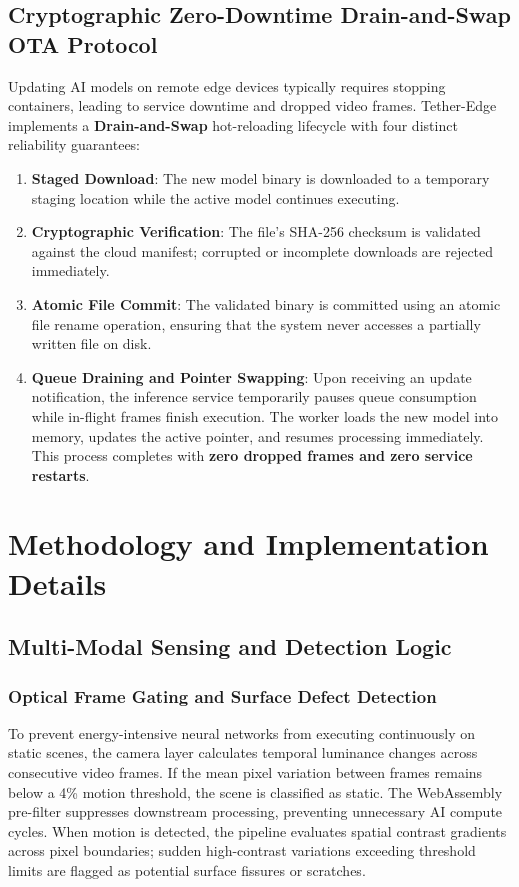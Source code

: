 \documentclass[conference]{IEEEtran}
\begin{document}
    \subsection{Cryptographic Zero-Downtime Drain-and-Swap OTA Protocol}
    Updating AI models on remote edge devices typically requires stopping containers, leading to service downtime and dropped video frames. Tether-Edge implements
    a \textbf{Drain-and-Swap} hot-reloading lifecycle with four distinct reliability guarantees:
    \begin{enumerate}
        \item \textbf{Staged Download}: The new model binary is downloaded to a temporary staging location while the active model continues executing.
        \item \textbf{Cryptographic Verification}: The file's SHA-256 checksum is validated against the cloud manifest; corrupted or incomplete downloads are
        rejected immediately.
        \item \textbf{Atomic File Commit}: The validated binary is committed using an atomic file rename operation, ensuring that the system never accesses a
        partially written file on disk.
        \item \textbf{Queue Draining and Pointer Swapping}: Upon receiving an update notification, the inference service temporarily pauses queue consumption while
        in-flight frames finish execution. The worker loads the new model into memory, updates the active pointer, and resumes processing immediately. This process
        completes with \textbf{zero dropped frames and zero service restarts}.
    \end{enumerate}

    \section{Methodology and Implementation Details}

    \subsection{Multi-Modal Sensing and Detection Logic}

    \subsubsection{Optical Frame Gating and Surface Defect Detection}
    To prevent energy-intensive neural networks from executing continuously on static scenes, the camera layer calculates temporal luminance changes across 
    consecutive video frames. If the mean pixel variation between frames remains below a 4\% motion threshold, the scene is classified as static. The WebAssembly
    pre-filter suppresses downstream processing, preventing unnecessary AI compute cycles. When motion is detected, the pipeline evaluates spatial contrast
    gradients across pixel boundaries; sudden high-contrast variations exceeding threshold limits are flagged as potential surface fissures or scratches.
\end{document}
